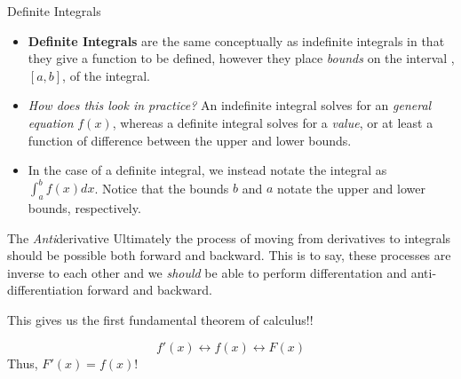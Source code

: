 \documentclass[
  ignorenonframetext,
]{beamer}
\providecommand{\tightlist}{%
  \setlength{\itemsep}{0pt}\setlength{\parskip}{0pt}}
\begin{document}
\begin{frame}{Definite Integrals}
\protect\hypertarget{definite-integrals}{}
\begin{itemize}[<+->]
\tightlist
\item
  \textbf{Definite Integrals} are the same conceptually as indefinite
  integrals in that they give a function to be defined, however they
  place \emph{bounds} on the interval , \([a,b]\), of the integral.
\end{itemize}

\begin{itemize}[<+->]
\tightlist
\item
  \emph{How does this look in practice?} \pause An indefinite integral
  solves for an \emph{general equation} \(f(x)\), whereas a definite
  integral solves for a \emph{value}, or at least a function of
  difference between the upper and lower bounds.
\end{itemize}

\begin{itemize}[<+->]
\tightlist
\item
  In the case of a definite integral, we instead notate the integral as
  \(\int_a^b f(x)dx\). Notice that the bounds \(b\) and \(a\) notate the
  upper and lower bounds, respectively.
\end{itemize}
\end{frame}

\begin{frame}{The \emph{Anti}derivative}
\protect\hypertarget{the-antiderivative}{}
Ultimately the process of moving from derivatives to integrals should be
possible both forward and backward. This is to say, these processes are
inverse to each other and we \emph{should} be able to perform
differentation and anti-differentiation forward and backward.

This gives us the first fundamental theorem of calculus!!

\[ f'(x) \longleftrightarrow f(x) \longleftrightarrow F(x)\] Thus,
\(F'(x)= f(x)\)!
\end{frame}
\end{document}
